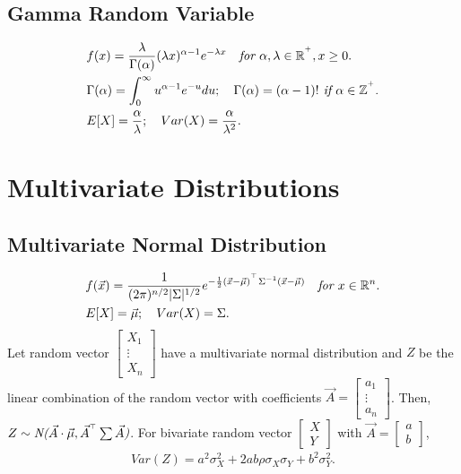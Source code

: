 \documentclass{article}
\begin{document}
\subsection{Gamma Random Variable}
\begin{align*}
    & f(x) = \frac{\lambda}{\Gamma(\alpha)} (\lambda x)^{\alpha-1} e^{-\lambda x} \quad \emph{for $\alpha, \lambda \in\mathbb{R}^{^+}$}, x \ge 0. \\
    & \Gamma(\alpha) = \int_0^\infty u^{\alpha-1}e^{-u}du; \quad \Gamma(\alpha) = (\alpha-1)! \emph{ if } \alpha\in\mathbb{Z^{^+}}. \\
    & E[X] = \frac{\alpha}{\lambda}; \quad Var(X) = \frac{\alpha}{\lambda^2}.
\end{align*}

\newpage
\section{Multivariate Distributions}
\subsection{Multivariate Normal Distribution}
\begin{align*}
    & f(\vec{x}) = \frac{1}{(2\pi)^{n/2}|\Sigma|^{1/2}} e^{-\frac{1}{2}(\vec{x}-\vec{\mu})^{^\top}\Sigma^{-1}(\vec{x}-\vec{\mu})} \quad \emph{for $x\in \mathbb{R}^n$}. \\
    & E[X] = \vec{\mu}; \quad Var(X) = \Sigma.
\end{align*}
Let random vector $\begin{bmatrix} X_1 \\ \vdots \\ X_n \end{bmatrix}$ have a multivariate normal distribution and $Z$ be the linear combination of the random vector with coefficients $\vec{A} = \begin{bmatrix}
    a_1 \\ 
    \vdots \\
    a_n
\end{bmatrix}$.
Then, $Z\sim \emph{N($\vec{A}\cdot \vec{\mu},\vec{A}^{^\top}\sum\vec{A}$)}$.
For bivariate random vector $\begin{bmatrix}
    X \\ Y
\end{bmatrix}$ with $\vec{A} = \begin{bmatrix}
    a \\ b
\end{bmatrix}$,
\begin{align*}
    Var(Z) = a^2\sigma_X^2+2ab\rho\sigma_X\sigma_Y+b^2\sigma_Y^2.
\end{align*}
\end{document}
